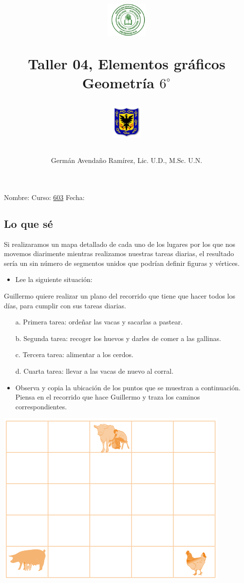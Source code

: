\documentclass[letterpaper,11pt,twoside]{article}
\author{Germ\'an Avenda\~no Ram\'irez, Lic. U.D., M.Sc. U.N.}
\title{\begin{minipage}{.2\textwidth}
\includegraphics[height=1.75cm]{Images/logo-colegio.png}\end{minipage}
\begin{minipage}{.55\textwidth}
\begin{center}
Taller 04, Elementos gráficos\\
Geometría $6^{\circ}$
\end{center}
\end{minipage}\hfill
\begin{minipage}{.2\textwidth}
\includegraphics[height=1.75cm]{Images/logo-sed.png} 
\end{minipage}}
\date{}
\begin{document}
\maketitle
Nombre: \hrulefill Curso: \underline{603} Fecha: \underline{\hspace*{2.5cm}}
\begin{multicols}{2}
 \section*{Lo que s\'e}
 Si realizaramos un mapa detallado de cada uno de los lugares por
los que nos movemos diarimente mientras realizamos nuestras
tareas diarias, el resultado sería un sin número de segmentos
unidos que podrían definir figuras y vértices.
\begin{itemize}
\item Lee la siguiente situación:
\end{itemize}
Guillermo quiere realizar un plano del recorrido que tiene
que hacer todos los días, para cumplir con sus tareas diarias.
\begin{enumerate}
\item[a.] Primera tarea: ordeñar las vacas y sacarlas a pastear.
\item[b.] Segunda tarea: recoger los huevos y darles de comer a las gallinas.
\item[c.] Tercera tarea: alimentar a los cerdos.
\item[d.] Cuarta tarea: llevar a las vacas de nuevo al corral.
\end{enumerate}
\begin{itemize}
\item Observa y copia la ubicación de los puntos que se muestran a
continuación. Piensa en el recorrido que hace Guillermo y traza
los caminos correspondientes.
\end{itemize}
\includegraphics[scale=.55]{Images/animales_domesticos.png}

\end{multicols}
\end{document}
